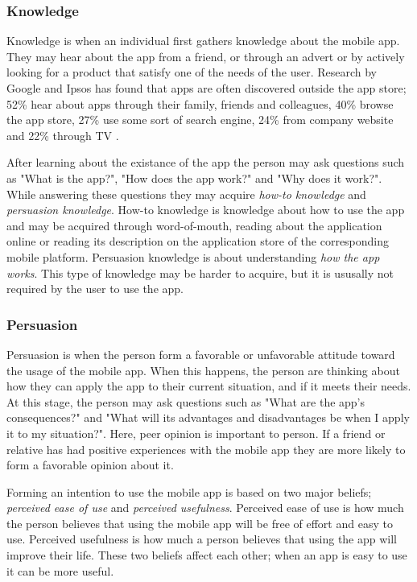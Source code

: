 \subsubsection{Knowledge}

Knowledge is when an individual first gathers knowledge about the mobile app. They may hear about the app from a friend, or through an advert or by actively looking for a product that satisfy one of the needs of the user. Research by Google and Ipsos has found that apps are often discovered outside the app store; 52\% hear about apps through their family, friends and colleagues, 40\% browse the app store, 27\% use some sort of search engine, 24\% from company website and 22\% through TV \cite{Tiongson2015}.

After learning about the existance of the app the person may ask questions such as "What is the app?", "How does the app work?" and "Why does it work?". While answering these questions they may acquire \textit{how-to knowledge} and \textit{persuasion knowledge}. How-to knowledge is knowledge about how to use the app and may be acquired through word-of-mouth, reading about the application online or reading its description on the application store of the corresponding mobile platform. Persuasion knowledge is about understanding \textit{how the app works}. This type of knowledge may be harder to acquire, but it is ususally not required by the user to use the app.

\subsubsection{Persuasion}

Persuasion is when the person form a favorable or unfavorable attitude toward the usage of the  mobile app. When this happens, the person are thinking about how they can apply the app to their current situation, and if it meets their needs. At this stage, the person may ask questions such as "What are the app's consequences?" and "What will its advantages and disadvantages be when I apply it to my situation?". Here, peer opinion is important to person. If a friend or relative has had positive experiences with the mobile app they are more likely to form a favorable opinion about it.

Forming an intention to use the mobile app is based on two major beliefs; \textit{perceived ease of use} and \textit{perceived usefulness}. Perceived ease of use is how much the person believes that using the mobile app will be free of effort and easy to use. Perceived usefulness is how much a person believes that using the app will improve their life. These two beliefs affect each other; when an app is easy to use it can be more useful.


